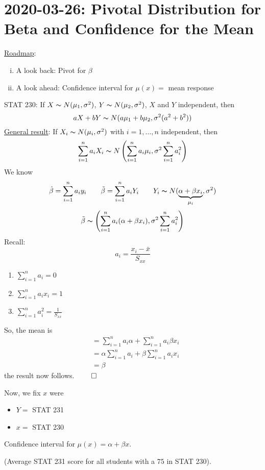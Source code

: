 \section{2020-03-26: Pivotal Distribution for Beta and Confidence for the Mean}
\underline{Roadmap}:
\begin{enumerate}[(i)]
    \item A look back: Pivot for $ \beta $
    \item A look ahead: Confidence interval for $ \mu(x)= $ mean response
\end{enumerate}
STAT 230: If $ X \thicksim N(\mu_1, \sigma^2) $, $ Y \thicksim N(\mu_2,\sigma^2) $,
$ X $ and $ Y $ independent, then
\[ aX+bY \thicksim N(a\mu_1+b\mu_2,\sigma^2(a^2+b^2)) \]
\underline{General result}: If $ X_i \thicksim N(\mu_i,\sigma^2) $
with $ i=1,\ldots ,n $ independent, then
\[ \sum\limits_{i=1}^{n} a_iX_i \thicksim N\left(\sum\limits_{i=1}^{n} a_i\mu_i,
    \sigma^2 \sum\limits_{i=1}^{n} a_i^2\right) \]
We know
\[ \hat{\beta}=\sum\limits_{i=1}^{n} a_iy_i\qquad
    \tilde{\beta}=\sum\limits_{i=1}^{n} a_iY_i\qquad
    Y_i \thicksim N(\underbrace{\alpha+\beta x_i}_{\mu_i},\sigma^2) \]
\[ \tilde{\beta} \thicksim \left( \sum\limits_{i=1}^{n} a_i(\alpha+\beta x_i),
    \sigma^2 \sum\limits_{i=1}^{n} a_i^2 \right) \]
Recall:
\[ a_i=\frac{x_i-\bar{x}}{S_{xx}}  \]
\begin{enumerate}
    \item $ \sum\limits_{i=1}^{n} a_i=0 $
    \item $ \sum\limits_{i=1}^{n} a_ix_i=1 $
    \item $ \sum\limits_{i=1}^{n} a_i^2= \frac{1}{S_{xx}} $
\end{enumerate}
So, the mean is
\begin{align*}
     & =\sum\limits_{i=1}^{n} a_i\alpha+\sum\limits_{i=1}^{n} a_i\beta x_i     \\
     & =\alpha \sum\limits_{i=1}^{n} a_i + \beta \sum\limits_{i=1}^{n} a_i x_i \\
     & =\beta
\end{align*}
the result now follows.
$ \qed $

Now, we fix $ x $ were
\begin{itemize}
    \item $ Y= $ STAT 231
    \item $ x= $ STAT 230
\end{itemize}
Confidence interval for $ \mu(x)=\alpha+\beta x $.

(Average STAT 231 score for all students with a $ 75 $ in STAT 230).

